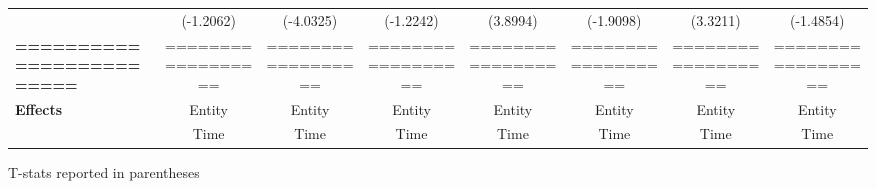 \begin{center}
\begin{tabular}{lccccccc}
\textbf{ }                         &      (-1.2062)       &          (-4.0325)          &          (-1.2242)           &               (3.8994)              &            (-1.9098)             &           (3.3211)          &           (-1.4854)            \\
\textbf{=========================} &  ==================  &      ==================     &      ==================      &          ==================         &        ==================        &      ==================     &       ==================       \\
\textbf{Effects}                   &        Entity        &            Entity           &            Entity            &                Entity               &              Entity              &            Entity           &             Entity             \\
\textbf{}                          &         Time         &             Time            &             Time             &                 Time                &               Time               &             Time            &              Time              \\
\bottomrule
\end{tabular}
\end{center}

T-stats reported in parentheses